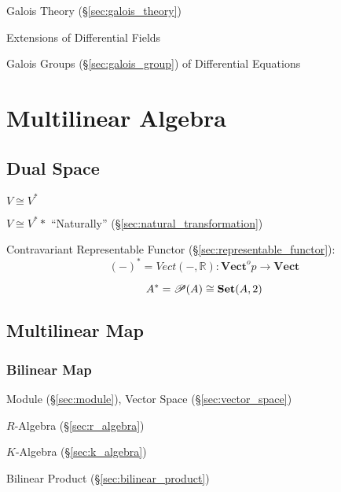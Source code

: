Galois Theory (\S\ref{sec:galois_theory})

Extensions of Differential Fields

Galois Groups (\S\ref{sec:galois_group}) of Differential Equations



\section{Multilinear Algebra}\label{sec:multilinear_algebra}

\subsection{Dual Space}\label{sec:dual_space}

$V \cong V^*$

$V \cong V^**$ ``Naturally'' (\S\ref{sec:natural_transformation})

Contravariant Representable Functor
(\S\ref{sec:representable_functor}):
\[
  (-)^* = Vect(-,\mathbb{R}) :
    \mathbf{Vect}^op \rightarrow \mathbf{Vect}
\]

\[
  A^* = \mathscr{P}(A) \cong \mathbf{Set}(A,2)
\]\cite{awodey06}



\subsection{Multilinear Map}\label{sec:multilinear_map}

\subsubsection{Bilinear Map}\label{sec:bilinear_map}

Module (\S\ref{sec:module}), Vector Space (\S\ref{sec:vector_space})

$R$-Algebra (\S\ref{sec:r_algebra})

$K$-Algebra (\S\ref{sec:k_algebra})

Bilinear Product (\S\ref{sec:bilinear_product})




